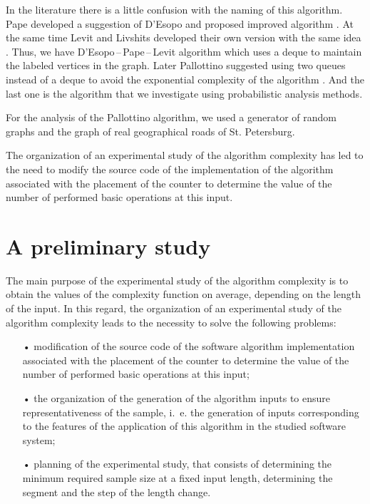 \documentclass[a4paper]{article}
\begin{document}
In the literature there is a little confusion with the naming of this algorithm. Pape developed a suggestion of D’Esopo \cite{desopo} and proposed improved algorithm \cite{pape}. At the same time Levit and Livshits developed their own version with the same idea \cite{levit_livshits}. Thus, we have D’Esopo\,--\,Pape\,--\,Levit algorithm which uses a deque to maintain the labeled vertices in the graph. Later Pallottino suggested using two queues instead of a deque to avoid the exponential complexity of the algorithm \cite{pallottino}. And the last one is the algorithm that we investigate using probabilistic analysis methods.

For the analysis of the Pallottino algorithm, we used a generator of random graphs and the graph of real geographical roads of St. Petersburg.

The organization of an experimental study of the algorithm complexity has led to the need to modify the source code of the implementation of the algorithm associated with the placement of the counter to determine the value of the number of performed basic operations at this input.

\section{A preliminary study} \label{sec:analysis_part_1}

The main purpose of the experimental study of the algorithm complexity is to obtain the values of the complexity function on average, depending on the length of the input. In this regard, the organization of an experimental study of the algorithm complexity leads to the necessity to solve the following problems:

\begin{enumerate}
	\item[•] modification of the source code of the software algorithm implementation associated with the placement of the counter to determine the value of the number of performed basic operations at this input;
	\item[•] the organization of the generation of the algorithm inputs to ensure representativeness of the sample, i.~e. the generation of inputs corresponding to the features of the application of this algorithm in the studied software system;
	\item[•] planning of the experimental study, that consists of determining the minimum required sample size at a fixed input length, determining the segment and the step of the length change.
\end{enumerate}
\end{document}
